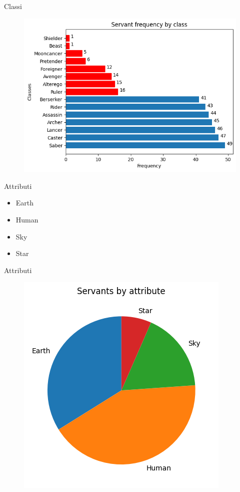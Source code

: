 \documentclass{beamer}
\begin{document}
\begin{darkframes}
  \begin{frame}{Classi}
    \begin{figure}
      \centering
      \includegraphics[scale=0.65]{./images/frequency_by_class.png}
    \end{figure}
  \end{frame}

  \begin{frame}{Attributi}
    \begin{itemize}
      \item Earth
      \item Human
      \item Sky
      \item Star
    \end{itemize}
  \end{frame}

  \begin{frame}{Attributi}
    \begin{figure}
      \centering
      \includegraphics[scale=0.65]{./images/frequency_by_attribute.png}
    \end{figure}
  \end{frame}


\end{darkframes}
\end{document}
